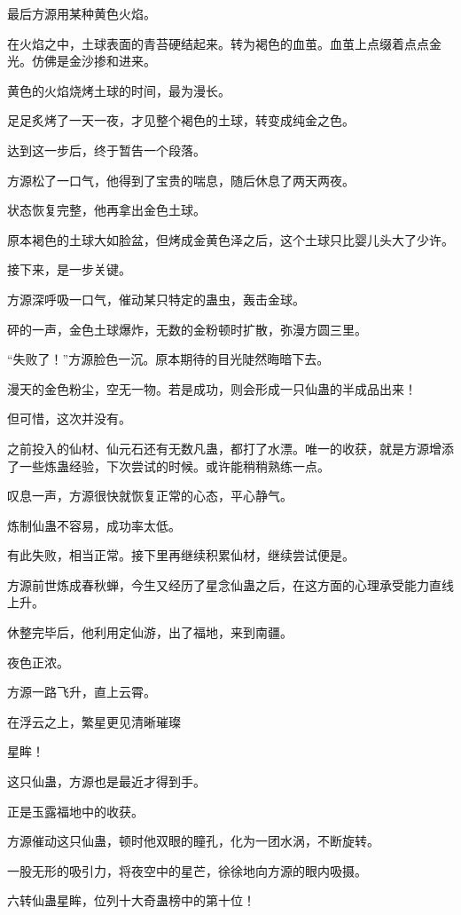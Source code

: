 \begin{this_body}
最后方源用某种黄色火焰。

在火焰之中，土球表面的青苔硬结起来。转为褐色的血茧。血茧上点缀着点点金光。仿佛是金沙掺和进来。

黄色的火焰烧烤土球的时间，最为漫长。

足足炙烤了一天一夜，才见整个褐色的土球，转变成纯金之色。

达到这一步后，终于暂告一个段落。

方源松了一口气，他得到了宝贵的喘息，随后休息了两天两夜。

状态恢复完整，他再拿出金色土球。

原本褐色的土球大如脸盆，但烤成金黄色泽之后，这个土球只比婴儿头大了少许。

接下来，是一步关键。

方源深呼吸一口气，催动某只特定的蛊虫，轰击金球。

砰的一声，金色土球爆炸，无数的金粉顿时扩散，弥漫方圆三里。

“失败了！”方源脸色一沉。原本期待的目光陡然晦暗下去。

漫天的金色粉尘，空无一物。若是成功，则会形成一只仙蛊的半成品出来！

但可惜，这次并没有。

之前投入的仙材、仙元石还有无数凡蛊，都打了水漂。唯一的收获，就是方源增添了一些炼蛊经验，下次尝试的时候。或许能稍稍熟练一点。

叹息一声，方源很快就恢复正常的心态，平心静气。

炼制仙蛊不容易，成功率太低。

有此失败，相当正常。接下里再继续积累仙材，继续尝试便是。

方源前世炼成春秋蝉，今生又经历了星念仙蛊之后，在这方面的心理承受能力直线上升。

休整完毕后，他利用定仙游，出了福地，来到南疆。

夜色正浓。

方源一路飞升，直上云霄。

在浮云之上，繁星更见清晰璀璨

星眸！

这只仙蛊，方源也是最近才得到手。

正是玉露福地中的收获。

方源催动这只仙蛊，顿时他双眼的瞳孔，化为一团水涡，不断旋转。

一股无形的吸引力，将夜空中的星芒，徐徐地向方源的眼内吸摄。

六转仙蛊星眸，位列十大奇蛊榜中的第十位！


\end{this_body}
